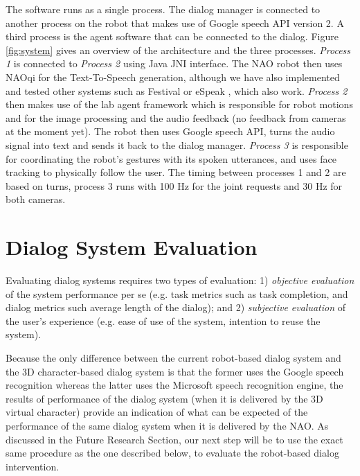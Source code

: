\documentclass[letterpaper]{article}
\begin{document}
The software runs as a single process. The
dialog manager is connected to another process on the robot that makes use of Google speech API 
version 2. 
A third process is 
the agent software that can be connected to the dialog. Figure \ref{fig:system} gives an 
overview of the architecture and the three processes. {\em Process 1} is connected to {\em Process 2} using 
Java JNI interface.  The NAO robot then uses NAOqi for the Text-To-Speech 
generation, although we have also implemented and tested other systems such as Festival 
\cite{taylor1998architecture} or eSpeak \cite{eSpeak}, which  also work. {\em Process 2} then makes 
use of the lab agent framework which is responsible for robot motions and 
for the image processing and the audio feedback (no feedback from cameras at the moment yet). The 
robot then uses Google speech API, turns the audio signal into text and sends it back to the dialog 
manager. {\em Process 3} is responsible for coordinating the robot's gestures with its spoken utterances, and uses face tracking to physically follow the user.  The timing between processes 1 and 2 are based on turns, process 3 runs with 100 Hz for the 
joint requests and 30 Hz for both cameras.

\section*{Dialog System Evaluation}

Evaluating dialog systems requires two types of evaluation: 1) {\em objective evaluation} of the system performance per se (e.g. task metrics such as task completion, and dialog metrics such average length of the dialog); and 2) {\em subjective evaluation} of the user's experience (e.g. ease of use of the system, intention to reuse the system).

Because the only difference between the current robot-based dialog system and the 3D character-based dialog system \cite{YASCLL14} is that the former uses the Google speech recognition whereas the latter uses the Microsoft speech recognition engine, the results of performance of the dialog system (when it is delivered by the 3D virtual character) provide an indication of what can be expected of the performance of the same dialog system when it is delivered by the NAO.  As discussed in the Future Research Section, our next step will be to use the exact same procedure as the one described below, to evaluate the robot-based dialog intervention.
\end{document}
